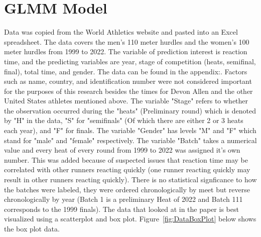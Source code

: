 \documentclass[12pt, letterpaper, titlepage]{article}
\begin{document}
\section{GLMM Model}
\label{sec:GLMM}
Data was copied from the World Athletics website and pasted into an Excel
spreadsheet. The data covers the men's 110 meter hurdles and the women's 100
meter hurdles from 1999 to 2022.  The variable of prediction interest is reaction
time, and the predicting variables are year, stage of competition (heats, 
semifinal, final), total time, and gender.  The data can be found in the appendix:.  
Factors such as name, country, and identification number were
not considered important for the purposes of this research besides the times for
Devon Allen and the other United States athletes mentioned above.  The variable "Stage"
refers to whether the observation occurred during the "heats" (Preliminary round) which
is denoted by "H" in the data, "S" for "semifinals" (Of which there are either 2 or 3 
heats each year), and "F" for finals. The variable "Gender" has levels "M" and "F" 
which stand for "male" and "female" respectively.  The variable "Batch" takes a 
numerical value and every heat of every round from 1999 to 2022 was assigned it's
own number.  This was added because of suspected issues that reaction time may be
correlated with other runners reacting quickly (one runner reacting quickly may
result in other runners reacting quickly).  There is no statistical signficance to
how the batches were labeled, they were ordered chronologically by meet but
reverse chronologically by year (Batch 1 is a preliminary Heat of 2022 and Batch
111 corresponds to the 1999 finals). The data that looked at in the paper
is best visualized using a scatterplot and box plot. Figure~\ref{fig:DataBoxPlot}
below shows the box plot data.
\end{document}
